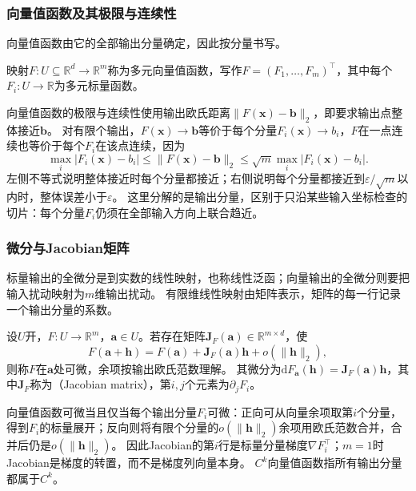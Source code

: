 \subsubsection{向量值函数及其极限与连续性}

向量值函数由它的全部输出分量确定，因此按分量书写。
\begin{definition}[多元向量值函数]
\label{def:multivariable-vector-function}
映射$F:U\subseteq\mathbb R^d\to\mathbb R^m$称为多元向量值函数，写作$F=(F_1,\ldots,F_m)^\top$，其中每个$F_i:U\to\mathbb R$为多元标量函数。
\end{definition}
向量值函数的极限与连续性使用输出欧氏距离$\lVert F(\bm x)-\bm b\rVert_2$，即要求输出点整体接近$\bm b$。
对有限个输出，$F(\bm x)\to\bm b$等价于每个分量$F_i(\bm x)\to b_i$，$F$在一点连续也等价于每个$F_i$在该点连续，因为
\[
 \max_i|F_i(\bm x)-b_i|\leq\lVert F(\bm x)-\bm b\rVert_2
 \leq\sqrt m\max_i|F_i(\bm x)-b_i|.
\]
左侧不等式说明整体接近时每个分量都接近；右侧说明每个分量都接近到$\varepsilon/\sqrt m$以内时，整体误差小于$\varepsilon$。
这里分解的是输出分量，区别于只沿某些输入坐标检查的切片：每个分量$F_i$仍须在全部输入方向上联合趋近。

\subsubsection{微分与Jacobian矩阵}

标量输出的全微分是到实数的线性映射，也称线性泛函；向量输出的全微分则要把输入扰动映射为$m$维输出扰动。
有限维线性映射由矩阵表示，矩阵的每一行记录一个输出分量的系数。
\begin{definition}[向量值函数的微分]
\label{def:multivariable-vector-differential}
设$U$开，$F:U\to\mathbb R^m$，$\bm a\in U$。若存在矩阵$\bm J_F(\bm a)\in\mathbb R^{m\times d}$，使
\begin{equation}
 F(\bm a+\bm h)=F(\bm a)+\bm J_F(\bm a)\bm h+o(\lVert\bm h\rVert_2),
\label{eq:analysis-jacobian-linearization}
\end{equation}
则称$F$在$\bm a$处可微，余项按输出欧氏范数理解。
其微分为$\mathrm dF_{\bm a}(\bm h)=\bm J_F(\bm a)\bm h$，其中$\bm J_F$称为（Jacobian matrix），第$i,j$个元素为$\partial_jF_i$。
\end{definition}
向量值函数可微当且仅当每个输出分量$F_i$可微：正向可从向量余项取第$i$个分量，得到$F_i$的标量展开；反向则将有限个分量的$o(\lVert\bm h\rVert_2)$余项用欧氏范数合并，合并后仍是$o(\lVert\bm h\rVert_2)$。
因此Jacobian的第$i$行是标量分量梯度$\nabla F_i^\top$；$m=1$时Jacobian是梯度的转置，而不是梯度列向量本身。
$C^k$向量值函数指所有输出分量都属于$C^k$。

